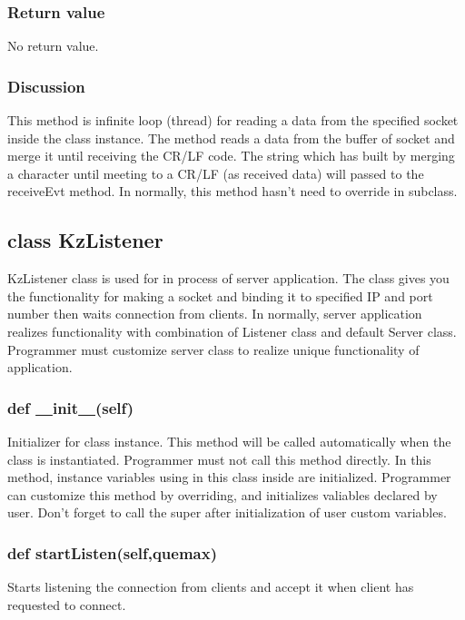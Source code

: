 \documentclass[a4paper,10pt]{jsarticle}
\begin{document}
\subsubsection*{Return value}
No return value.

\subsubsection*{Discussion}
This method is infinite loop (thread) for reading a data from the specified socket inside the class instance.
The method reads a data from the buffer of socket and merge it until receiving the CR/LF code.
The string which has built by merging a character until meeting to a CR/LF (as received data) will passed to the receiveEvt method.
In normally, this method hasn't need to override in subclass.

\subsection{class KzListener}
KzListener class is used for in process of server application. The class gives you the functionality for making a socket and binding it to specified IP and port number then waits connection from  clients.
In normally, server application realizes functionality with combination of Listener class and default Server class.
Programmer must customize server class to realize unique functionality of application.


\subsubsection{def \underline{\ \ }init\underline{\ \ }(self)}
Initializer for class instance. This method will be called automatically when the class is instantiated.
Programmer must not call this method directly.
In this method, instance variables using in this class inside are initialized.
Programmer can customize this method by overriding, and initializes valiables declared by user.
Don't forget to call the super after initialization of user custom variables.


\subsubsection{def startListen(self,quemax)}
Starts listening the connection from clients and accept it when client has requested to connect.
\end{document}
